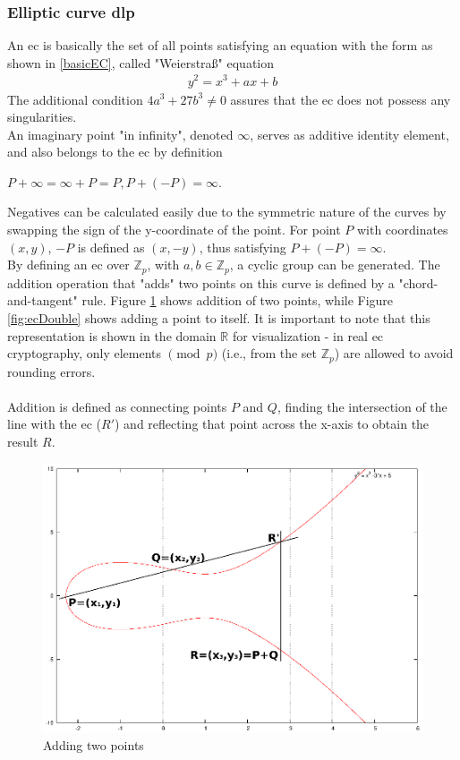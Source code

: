 \subsubsection{Elliptic curve \gls{dlp}}\label{sec:ecIntro}
An \gls{ec} is basically the set of all points
satisfying an equation with the form as shown in \ref{basicEC}, called "Weierstraß" equation
\begin{align}\label{basicEC}
 y^2 = x^3 + ax +b
\end{align}
The additional condition $4a^3 + 27b^3 \neq 0$ assures that the \gls{ec} does not possess any singularities.
\\
An imaginary point "in infinity", denoted $\infty$, serves as additive identity element, and also belongs to the \gls{ec} by definition
\begin{center}
 $P + \infty = \infty + P = P, P + (-P) = \infty$.
\end{center}
Negatives can be calculated easily due to the symmetric nature of the curves by swapping the sign of the y-coordinate of the point. For point $P$ with coordinates $(x, y)$, $-P$ is defined as
$(x,-y)$, thus satisfying $P + (-P) = \infty$.
\\
By defining an \gls{ec} over $\mathbb{Z}_p$, with $a, b \in \mathbb{Z}_p$, a cyclic group can be generated. The addition operation that "adds" two points on
this curve is defined by a "chord-and-tangent" rule. Figure \ref{fig:ecAdd}
shows addition of two points, while Figure \ref{fig:ecDouble} shows adding a point to itself. It is important to note that this representation is shown in the domain
$\mathbb{R}$ for visualization - in real \gls{ec} cryptography, only elements $\pmod p$ (i.e., from the set $\mathbb{Z}_p$)
are allowed to avoid rounding errors. 
\\
\\
Addition is defined as connecting points $P$ and 
$Q$, finding the intersection of the line with the \gls{ec} ($R'$) and reflecting that point across the x-axis to obtain the result $R$. 
          \begin{figure}[H]
          \centering
              \includegraphics[width=0.6\linewidth]{figures/ecAdd.eps}
              \caption{Adding two points}
              \label{fig:ecAdd}
          \end{figure}
